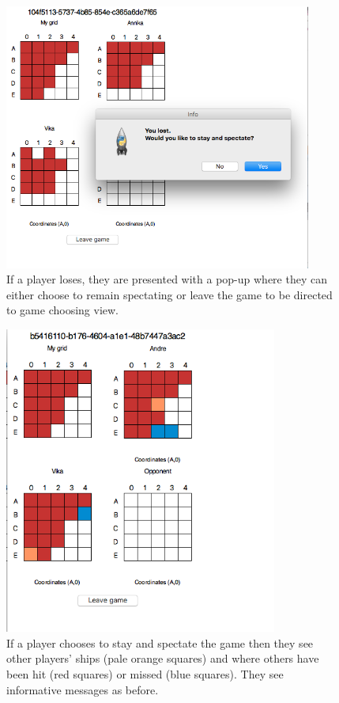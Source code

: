 \documentclass[]{article}
\begin{document}
\begin{figure}[!hbt]
	\centering
	\includegraphics[width=0.9\textwidth]{LoserChoose.png}
	\caption{If a player loses, they are presented with a pop-up where they can either choose to remain spectating or leave the game to be directed to game choosing view.}
	\label{fig:LoserChoose}
\end{figure}

\begin{figure}[!hbt]
	\centering
	\includegraphics[width=0.8\textwidth]{SpectateInit.png}
	\caption{If a player chooses to stay and spectate the game then they see other players' ships (pale orange squares) and where others have been hit (red squares) or missed (blue squares). They see informative messages as before.}
	\label{fig:SpectateInit}
\end{figure}
\end{document}
